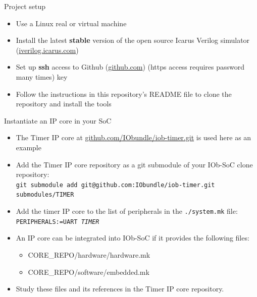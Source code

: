 \documentclass [xcolor=svgnames, t] {beamer}
\begin{document}
\begin{frame}{Project setup}
\begin{center}
  \begin{itemize}
    \item Use a Linux real or virtual machine
    \item Install the latest {\bf stable} version of the open source Icarus Verilog simulator (\url{iverilog.icarus.com})
    \item Set up {\bf ssh} access to Github (\url{github.com}) (https access requires password many times)
      key
    \item Follow the instructions in this repository's README file to clone the repository and install the tools
  \end{itemize}
\end{center}
\end{frame}


\begin{frame}{Instantiate an IP core in your SoC}
  \begin{itemize}
  \item The Timer IP core at \url{github.com/IObundle/iob-timer.git} is used here as an example
  \item Add the Timer IP core repository as a git submodule of your IOb-SoC clone repository:\\
    {\tt \tiny git submodule add git@github.com:IObundle/iob-timer.git submodules/TIMER}
  \item Add the timer IP core to the list of peripherals in the {\tt ./system.mk} file:\\
    {\tt PERIPHERALS:=UART {\em TIMER}}
  \item An IP core can be integrated into IOb-SoC if it provides the following files: 
    \begin{itemize}
    \item CORE\_REPO/hardware/hardware.mk
    \item CORE\_REPO/software/embedded.mk
    \end{itemize}
  \item Study these files and its references in the Timer IP core repository.
  \end{itemize}
\end{frame}
\end{document}
